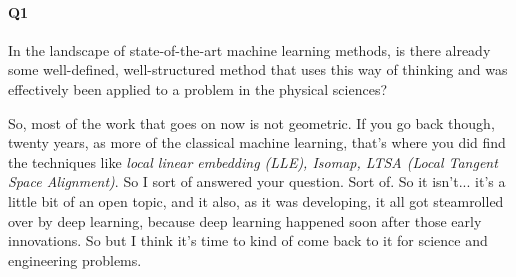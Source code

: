 \paragraph{Q1} In the landscape of state-of-the-art machine learning methods, is there already some well-defined, well-structured method that uses this way of thinking and was effectively been applied to a problem in the physical sciences?

So, most of the work that goes on now is not geometric. If you go back though, twenty years, as more of the classical machine learning, that's where you did find the techniques like \textit{local linear embedding (LLE), Isomap, LTSA (Local Tangent Space Alignment)}.  So I sort of answered your question. Sort of. So it isn't... it's a little bit of an open topic, and it also, as it was developing, it all got steamrolled over by deep learning, because deep learning happened soon after those early innovations. So but I think it's time to kind of come back to it for science and engineering problems. 